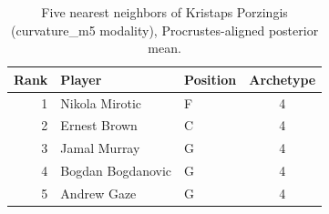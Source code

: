 \begin{table}[htbp]
  \centering\small
  \begin{tabular}{rllc}
    \toprule
    Rank & Player & Position & Archetype \\
    \midrule
    1 & Nikola Mirotic & F & 4 \\
    2 & Ernest Brown & C & 4 \\
    3 & Jamal Murray & G & 4 \\
    4 & Bogdan Bogdanovic & G & 4 \\
    5 & Andrew Gaze & G & 4 \\
    \bottomrule
  \end{tabular}
  \caption{Five nearest neighbors of Kristaps Porzingis (curvature_m5 modality), Procrustes-aligned posterior mean.}
  \label{tab:Kristaps_Porzingis_neighbors_curvature_m5}
\end{table}

